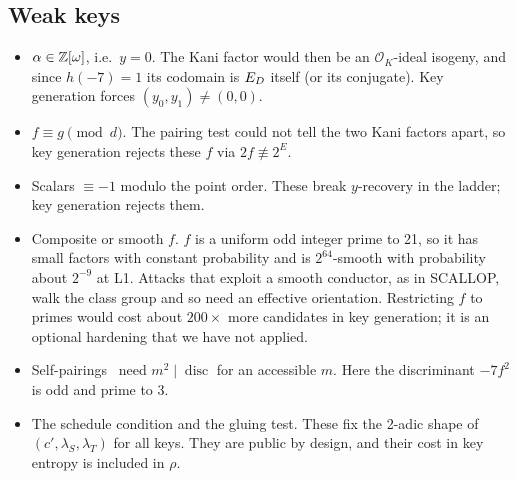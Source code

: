 \subsection{Weak keys}\label{sec:weak}
\begin{itemize}
\item $\alpha\in\mathbb{Z}[\omega]$, i.e.\ $y=0$. The Kani factor would then be an
  $\mathcal{O}_K$-ideal isogeny, and since $h(-7)=1$ its codomain is $E_D$
  itself (or its conjugate). Key generation forces $(y_0,y_1)\ne(0,0)$.
\item $f\equiv g\pmod d$. The pairing test could not tell the two Kani
  factors apart, so key generation rejects these $f$ via $2f\not\equiv2^E$.
\item Scalars $\equiv-1$ modulo the point order. These break $y$-recovery in
  the ladder; key generation rejects them.
\item Composite or smooth $f$. $f$ is a uniform odd integer prime to 21, so
  it has small factors with constant probability and is $2^{64}$-smooth with
  probability about $2^{-9}$ at L1. Attacks that exploit a smooth conductor,
  as in SCALLOP, walk the class group and so need an effective
  orientation. Restricting $f$ to primes would cost about $200\times$ more
  candidates in key generation; it is an optional hardening that we have not
  applied.
\item Self-pairings~\cite{CHMMvBV23} need $m^2\mid\operatorname{disc}$ for
  an accessible $m$. Here the discriminant $-7f^2$ is odd and prime to 3.
\item The schedule condition and the gluing test. These fix the 2-adic shape
  of $(c',\lambda_S,\lambda_T)$ for all keys. They are public by design, and
  their cost in key entropy is included in $\rho$.
\end{itemize}

